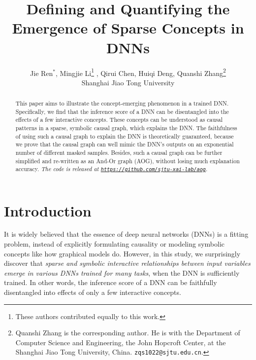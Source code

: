 \documentclass[10pt,twocolumn,letterpaper]{article}
\begin{document}
\title{Defining and Quantifying the Emergence of Sparse Concepts in DNNs}

\author{Jie Ren$^*$, Mingjie Li\thanks{These authors contributed equally to this work.} ,  Qirui Chen, Huiqi Deng, Quanshi Zhang\thanks{Quanshi Zhang is the corresponding author. He is with the Department of Computer Science and Engineering, the John Hopcroft Center, at the Shanghai Jiao Tong University, China. \texttt{zqs1022@sjtu.edu.cn}.}
\\
Shanghai Jiao Tong University\\
}
\maketitle

\begin{abstract}
This paper aims to illustrate the concept-emerging phenomenon in a trained DNN.
Specifically, we find that the inference score of a DNN can be disentangled into the effects of a few interactive concepts.
These concepts can be understood as causal patterns in a sparse, symbolic causal graph, which explains the DNN.
The faithfulness of using such a causal graph to explain the DNN is theoretically guaranteed, because we prove that the causal graph can well mimic the DNN's outputs on an exponential number of different masked samples.
Besides, such a causal graph can be further simplified and re-written as an And-Or graph (AOG), without losing much explanation accuracy.
\textit{The code is released at \href{https://github.com/sjtu-xai-lab/aog}{\texttt{https://github.com/sjtu-xai-lab/aog}}.}
\end{abstract}


\section{Introduction}
\label{sec:introduction}

It is widely believed that the essence of deep neural networks (DNNs) is a fitting problem, instead of explicitly formulating causality or modeling symbolic concepts like how graphical models do.
However, in this study, we surprisingly discover that \textit{sparse and symbolic interactive relationships between input variables emerge in various DNNs trained for many tasks}, when the DNN is sufficiently trained.
In other words, the inference score of a DNN can be faithfully disentangled into effects of only a few interactive concepts.
\end{document}
